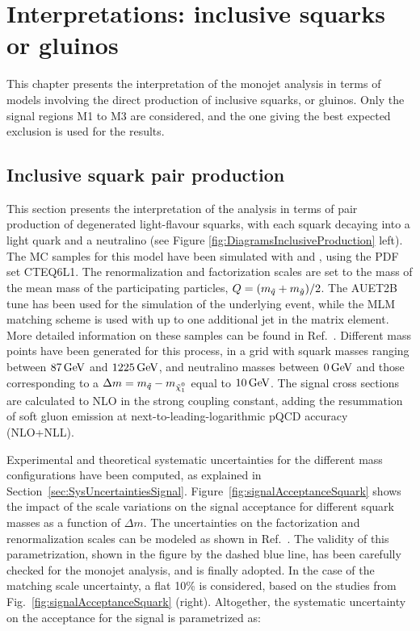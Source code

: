 

\cleardoublepage
\chapter{Interpretations: inclusive squarks or gluinos}
    \label{chapter:SquarkGluinoProduction}

This chapter presents the interpretation of the monojet analysis in terms of models involving the direct production of inclusive squarks, or gluinos.
Only the signal regions M1 to M3 are considered, and the one giving the best expected exclusion is used for the results.


\section{Inclusive squark pair production}
    \label{sec:InclusiveSquarkProduction}

This section presents the interpretation of the analysis in terms of pair production of degenerated light-flavour squarks, with each squark decaying into a light quark and a neutralino (see Figure \ref{fig:DiagramsInclusiveProduction} left).
The MC samples for this model have been simulated with \madgraph{} and \pythia{}, using the PDF set CTEQ6L1.
The renormalization and factorization scales are set to the mass of the mean mass of the participating particles, $Q=(m_{\tilde{q}}+m_{\tilde{g}})/2$.
The AUET2B tune has been used for the simulation of the underlying event, while the MLM matching scheme is used with up to one additional jet in the \madgraph{} matrix element.
More detailed information on these samples can be found in Ref.~\cite{Aad:2014wea}.
Different mass points have been generated for this process, in a grid with squark masses ranging between $\unit[87]{GeV}$ and $\unit[1225]{GeV}$, and neutralino masses between $\unit[0]{GeV}$ and those corresponding to a $\Delta m = m_{\squark} - m_{\ninoone}$ equal to $\unit[10]{GeV}$.
The signal cross sections are calculated to NLO in the strong coupling constant, adding the resummation of soft gluon emission at next-to-leading-logarithmic pQCD accuracy (NLO+NLL).

Experimental and theoretical systematic uncertainties for the different mass configurations have been computed, as explained in Section~\ref{sec:SysUncertaintiesSignal}.
Figure~\ref{fig:signalAcceptanceSquark} shows the impact of the scale variations on the signal acceptance for different squark masses as a function of $\Delta m$.
The uncertainties on the factorization and renormalization scales can be modeled as shown in Ref.~\cite{Aad:2014wea}.
The validity of this parametrization, shown in the figure by the dashed blue line, has been carefully checked for the monojet analysis, and is finally adopted.
In the case of the matching scale uncertainty, a flat 10\% is considered, based on the studies from Fig.~\ref{fig:signalAcceptanceSquark} (right).
Altogether, the systematic uncertainty on the acceptance for the signal is parametrized as:

